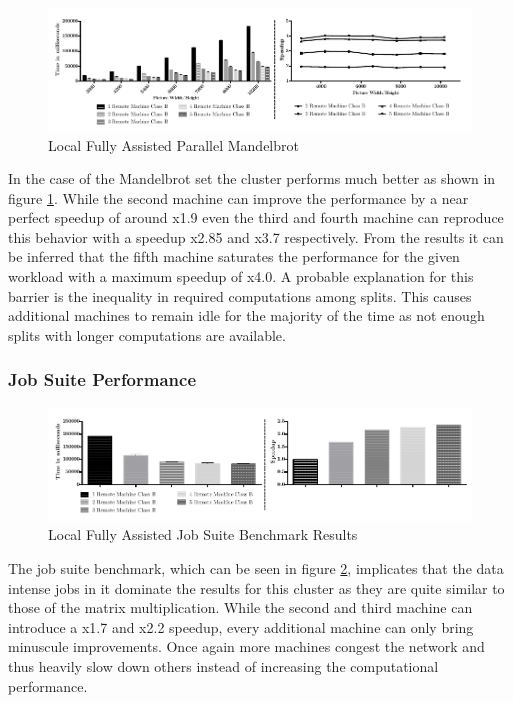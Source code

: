 \begin{figure}[H]
	
	\includegraphics[width=1.0\textwidth]{images/local_fully_assisted_mandelbrot.pdf}
	\centering
	\caption{Local Fully Assisted Parallel Mandelbrot}
	\label{img:fully_assisted_parallel_mandelbrot}
\end{figure}

In the case of the Mandelbrot set the cluster performs much better as shown in figure \ref{img:fully_assisted_parallel_mandelbrot}. While the second machine can improve the performance by a near perfect speedup of around x1.9 even the third and fourth machine can reproduce this behavior with a speedup x2.85 and x3.7 respectively. From the results it can be inferred that the fifth machine saturates the performance for the given workload with a maximum speedup of x4.0. A probable explanation for this barrier is the inequality in required computations among splits. This causes additional machines to remain idle for the majority of the time as not enough splits with longer computations are available.

\subsubsection*{Job Suite Performance}

\begin{figure}[H]
	
	\includegraphics[width=1.0\textwidth]{images/local_fully_assisted_full_benchmark.pdf}
	\centering
	\caption{Local Fully Assisted Job Suite Benchmark Results}
	\label{img:local_fully_assisted_benchmark_results}
\end{figure}

The job suite benchmark, which can be seen in figure \ref{img:local_fully_assisted_benchmark_results}, implicates that the data intense jobs in it dominate the results for this cluster as they are quite similar to those of the matrix multiplication. While the second and third machine can introduce a x1.7 and x2.2 speedup, every additional machine can only bring minuscule improvements. Once again more machines congest the network and thus heavily slow down others instead of increasing the computational performance.

